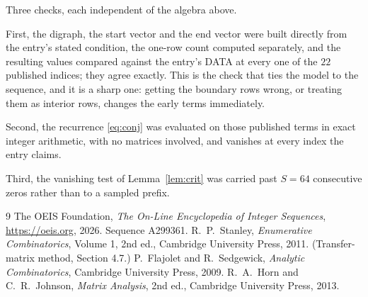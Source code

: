 \documentclass[11pt,a4paper]{article}
\theoremstyle{plain}
\theoremstyle{definition}
\begin{document}
Three checks, each independent of the algebra above.

First, the digraph, the start vector and the end vector were built directly from the
entry's stated condition, the one-row count computed separately, and the resulting values
compared against the entry's DATA at every one of the $22$ published indices; they
agree exactly. This is the check that ties the model to the sequence, and it is a sharp one:
getting the boundary rows wrong, or treating them as interior rows, changes the early terms
immediately.

Second, the recurrence \eqref{eq:conj} was evaluated on those published terms in exact
integer arithmetic, with no matrices involved, and vanishes at every index the entry claims.

Third, the vanishing test of Lemma~\ref{lem:crit} was carried past $S=64$ consecutive
zeros rather than to a sampled prefix.

\begin{thebibliography}{9}
 The OEIS Foundation, \emph{The On-Line Encyclopedia of Integer
Sequences}, \url{https://oeis.org}, 2026. Sequence A299361.
 R.~P.~Stanley, \emph{Enumerative Combinatorics}, Volume 1, 2nd ed.,
Cambridge University Press, 2011. (Transfer-matrix method, Section 4.7.)
 P.~Flajolet and R.~Sedgewick, \emph{Analytic Combinatorics}, Cambridge
University Press, 2009.
 R.~A.~Horn and C.~R.~Johnson, \emph{Matrix Analysis}, 2nd ed., Cambridge
University Press, 2013.
\end{thebibliography}
\end{document}
